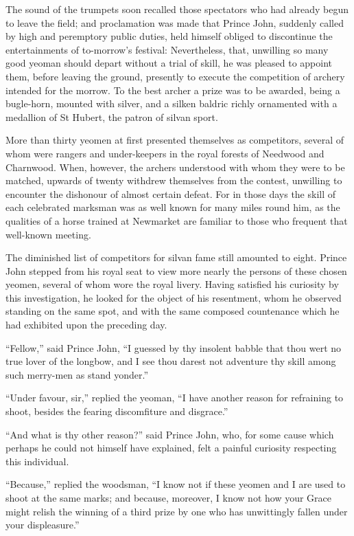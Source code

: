 The sound of the trumpets soon recalled those spectators who had already
begun to leave the field; and proclamation was made that Prince John,
suddenly called by high and peremptory public duties, held himself
obliged to discontinue the entertainments of to-morrow's festival:
Nevertheless, that, unwilling so many good yeoman should depart without
a trial of skill, he was pleased to appoint them, before leaving the
ground, presently to execute the competition of archery intended for the
morrow. To the best archer a prize was to be awarded, being a
bugle-horn, mounted with silver, and a silken baldric richly ornamented
with a medallion of St Hubert, the patron of silvan sport.

More than thirty yeomen at first presented themselves as competitors,
several of whom were rangers and under-keepers in the royal forests of
Needwood and Charnwood. When, however, the archers understood with whom
they were to be matched, upwards of twenty withdrew themselves from the
contest, unwilling to encounter the dishonour of almost certain defeat.
For in those days the skill of each celebrated marksman was as well
known for many miles round him, as the qualities of a horse trained at
Newmarket are familiar to those who frequent that well-known meeting.

The diminished list of competitors for silvan fame still amounted to
eight. Prince John stepped from his royal seat to view more nearly the
persons of these chosen yeomen, several of whom wore the royal livery.
Having satisfied his curiosity by this investigation, he looked for the
object of his resentment, whom he observed standing on the same spot,
and with the same composed countenance which he had exhibited upon the
preceding day.

``Fellow,'' said Prince John, ``I guessed by thy insolent babble that
thou wert no true lover of the longbow, and I see thou darest not
adventure thy skill among such merry-men as stand yonder.''

``Under favour, sir,'' replied the yeoman, ``I have another reason for
refraining to shoot, besides the fearing discomfiture and disgrace.''

``And what is thy other reason?'' said Prince John, who, for some cause
which perhaps he could not himself have explained, felt a painful
curiosity respecting this individual.

``Because,'' replied the woodsman, ``I know not if these yeomen and I
are used to shoot at the same marks; and because, moreover, I know not
how your Grace might relish the winning of a third prize by one who has
unwittingly fallen under your displeasure.''


